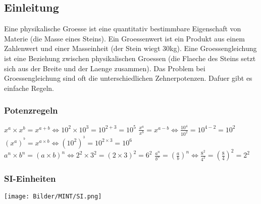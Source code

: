 \subsection{Einleitung}
    Eine physikalische Groesse ist eine quantitativ bestimmbare Eigenschaft von Materie (die Masse eines Steins). Ein Groessenwert ist ein Produkt aus einem Zahlenwert und einer Masseinheit (der Stein wiegt 30kg). 
    \newline
    Eine Groessengleichung ist eine Beziehung zwischen physikalischen Groessen (die Flaeche des Steins setzt sich aus der Breite und der Laenge zusammen).
    \newline
    Das Problem bei Groessengleichung sind oft die unterschiedlichen Zehnerpotenzen. Dafuer gibt es einfache Regeln.
    \subsubsection{Potenzregeln}
        $x^{a} \times x^b = x^{a + b} \iff 10^2 \times 10^3 = 10^{2 + 3} = 10^5$
        \newline
        $\frac{x^a}{x^b} = x^{a - b} \iff \frac{10^4}{10^2} = 10^{4 - 2} = 10^2$
        \newline
        $(x^a)^{^{b}} = x^{a \times b} \iff (10^2)^{^{3}} = 10^{2 \times 3} = 10^6$
        \newline
        $a^n \times b^n = (a \times b)^n \iff 2^2 \times 3^2 = (2 \times 3)^2 = 6^2$
        \newline
        $\frac{a^n}{b^n} = (\frac{a}{b})^n \iff \frac{8^2}{4^2} = (\frac{8}{4})^2 = 2^2$
        \newline

    \subsubsection{SI-Einheiten}
        \texttt{[image: Bilder/MINT/SI.png]}
    \newpage
    
\newpage